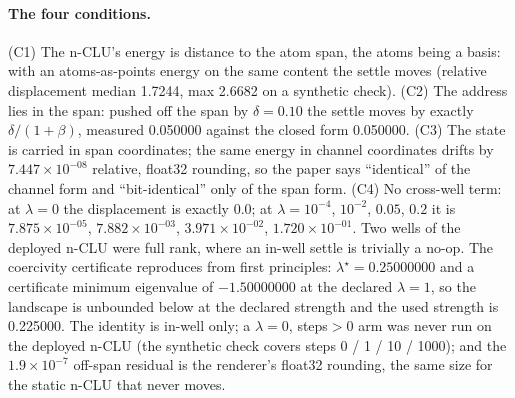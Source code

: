 \documentclass{article} %
\newcommand{\sci}[2]{\ensuremath{#1\times10^{#2}}}
\begin{document}
\paragraph{The four conditions.} (C1) The n-CLU's energy is distance to the atom span, the atoms
being a basis: with an atoms-as-points energy on the same content the settle moves (relative
displacement median 1.7244, max 2.6682 on a synthetic check). (C2) The address lies in the span:
pushed off the span by $\delta=0.10$ the settle moves by exactly $\delta/(1+\beta)$, measured
0.050000 against the closed form 0.050000. (C3) The state is carried in span coordinates; the same
energy in channel coordinates drifts by \sci{7.447}{-08} relative, float32 rounding, so the paper
says ``identical'' of the channel form and ``bit-identical'' only of the span form. (C4) No
cross-well term: at $\lambda=0$ the displacement is exactly 0.0; at
$\lambda=10^{-4}$, $10^{-2}$, $0.05$, $0.2$ it is \sci{7.875}{-05}, \sci{7.882}{-03},
\sci{3.971}{-02}, \sci{1.720}{-01}. Two wells of the deployed n-CLU were full rank, where an in-well
settle is trivially a no-op. The coercivity certificate reproduces from first principles:
$\lambda^\star=0.25000000$ and a certificate minimum eigenvalue of $-1.50000000$ at the declared
$\lambda=1$, so the landscape is unbounded below at the declared strength and the used strength is
0.225000. %
The identity is in-well only; a $\lambda=0$, steps$>0$ arm was never run on the deployed n-CLU (the
synthetic check covers steps 0 / 1 / 10 / 1000); and the \sci{1.9}{-7} off-span residual is the
renderer's float32 rounding, the same size for the static n-CLU that never moves.
\end{document}
